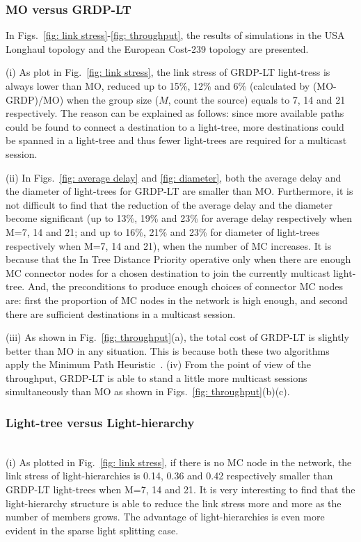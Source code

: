 \documentclass[conference]{IEEEtran}
\begin{document}
\subsubsection{MO versus GRDP-LT}
\label{subsubsec: MO versus GRDP-LT}

In Figs.~\ref{fig: link stress}-\ref{fig: throughput}, the results of simulations in the USA Longhaul topology and the European Cost-239 topology are presented.

(i) As plot in Fig.~\ref{fig: link stress}, the link stress of GRDP-LT light-tress is always lower than MO, reduced up to 15\%, 12\% and 6\% (calculated by (MO-GRDP)/MO) when the group size ($M$, count the source) equals to 7, 14 and 21 respectively. The reason can be explained as follows: since more available paths could be found to connect a destination to a light-tree, more destinations could be spanned in a light-tree and thus fewer light-trees are required for a multicast session.

(ii) In Figs.~\ref{fig: average delay} and \ref{fig: diameter}, both the average delay and the diameter of light-trees for GRDP-LT are smaller than MO. Furthermore, it is not difficult to find that the reduction of the average delay and the diameter become significant (up to 13\%, 19\% and 23\% for average delay respectively when M=7, 14 and 21; and up to 16\%, 21\% and 23\% for diameter of light-trees respectively when M=7, 14 and 21), when the number of MC increases. It is because that the In Tree Distance Priority operative only when there are enough MC connector nodes for a chosen destination to join the currently multicast light-tree. And, the preconditions to produce enough choices of connector MC nodes are: first the proportion of MC nodes in the network is high enough, and second there are sufficient destinations in a multicast session.

(iii) As shown in Fig.~\ref{fig: throughput}(a), the total cost of GRDP-LT is slightly better than MO in any situation. This is because both these two algorithms apply the Minimum Path Heuristic~\cite{hTakahashi1980}.
(iv) From the point of view of the throughput, GRDP-LT is able to stand a little more multicast sessions simultaneously than MO as shown in Figs.~\ref{fig: throughput}(b)(c).

\subsubsection{Light-tree versus Light-hierarchy}
\label{subsubsec: Light-tree versus Light-hierarchy}
~\\
(i) As plotted in Fig.~\ref{fig: link stress}, if there is no MC node in the network, the link stress of light-hierarchies is 0.14, 0.36 and 0.42 respectively smaller than GRDP-LT light-trees when M=7, 14 and 21. It is very interesting to find that the light-hierarchy structure is able to reduce the link stress more and more as the number of members grows. The advantage of light-hierarchies is even more evident in the sparse light splitting case.
\end{document}
